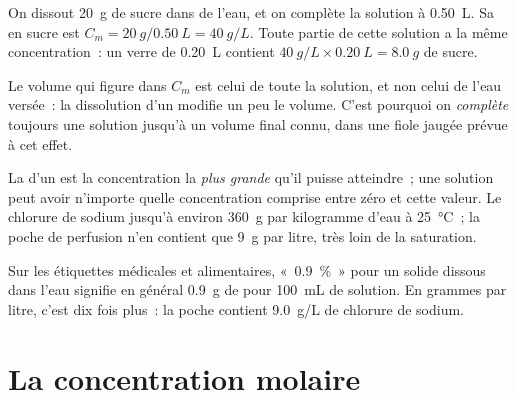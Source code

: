 \begin{example}\label{ex:g10:concentration-and-dilution:sugar}
On dissout \qty{20}{g} de sucre dans de l'eau, et on complète la
solution à \qty{0.50}{L}. Sa  en sucre est
$C_m = \qty{20}{g} / \qty{0.50}{L} = \qty{40}{g/L}$. Toute partie de
cette solution a la même concentration~: un verre de \qty{0.20}{L}
contient $\qty{40}{g/L} \times \qty{0.20}{L} = \qty{8.0}{g}$ de sucre.
\end{example}


\begin{remark}\label{rem:g10:concentration-and-dilution:volume}
Le volume qui figure dans $C_m$ est celui de toute la solution, et non
celui de l'eau versée~: la dissolution d'un  modifie un peu le
volume. C'est pourquoi on \emph{complète} toujours une solution jusqu'à
un volume final connu, dans une fiole jaugée prévue à cet effet.
\end{remark}

\begin{remark}\label{rem:g10:concentration-and-dilution:not-solubility}
La  d'un  est la concentration la \emph{plus grande}
qu'il puisse atteindre~; une solution peut avoir n'importe quelle
concentration comprise entre zéro et cette valeur. Le chlorure de sodium
 jusqu'à environ \qty{360}{g} par kilogramme d'eau à
\qty{25}{\celsius}~; la poche de perfusion n'en contient que \qty{9}{g}
par litre, très loin de la saturation.
\end{remark}

\begin{remark}\label{rem:g10:concentration-and-dilution:percent}
Sur les étiquettes médicales et alimentaires, «~0.9~\%~» pour un solide
dissous dans l'eau signifie en général \qty{0.9}{g} de  pour
\qty{100}{mL} de solution. En grammes par litre, c'est dix fois plus~:
la poche contient \qty{9.0}{g/L} de chlorure de sodium.
\end{remark}

\section{La concentration molaire}

